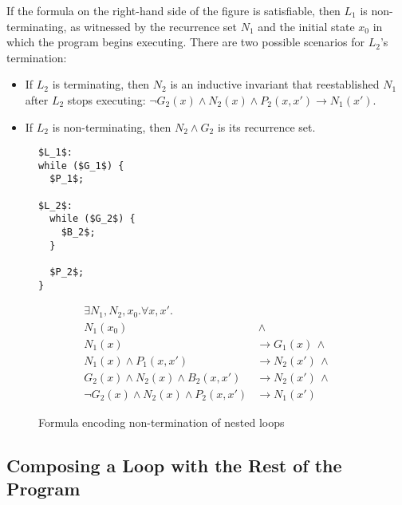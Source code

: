 \documentclass[preprint]{sigplanconf}
\theoremstyle{definition}
\begin{document}
If the formula on the right-hand side of the figure is satisfiable, then
$L_1$ is non-terminating, as witnessed by the recurrence set $N_1$ and the
initial state $x_0$ in which the program begins executing.  There are two
possible scenarios for $L_2$'s termination:
%
\begin{itemize}
%
\item If $L_2$ is terminating, then $N_2$ is an inductive invariant that
reestablished $N_1$ after $L_2$ stops executing: $\lnot G_2(x) \wedge N_2(x)
\wedge P_2(x,x') \rightarrow N_1(x') $.
%
\item If $L_2$ is non-terminating, then $N_2 \wedge G_2$ is its recurrence set.
%
\end{itemize}

\begin{figure*}
\begin{framed}
 \begin{minipage}{0.16\textwidth}
\begin{lstlisting}[mathescape=true]
$L_1$:
while ($G_1$) {
  $P_1$;

$L_2$:
  while ($G_2$) {
    $B_2$;
  }

  $P_2$;
}
\end{lstlisting}
\end{minipage}
\vline
\begin{minipage}{0.82\textwidth}
\begin{align*}
 \exists N_1, N_2, x_0 . \forall x, x' . \\
  N_1(x_0) & \, \wedge \\
  N_1(x) & \rightarrow G_1(x) \, \wedge \\
  N_1(x) \wedge P_1(x,x') & \rightarrow N_2(x') \, \wedge \\
  G_2(x) \wedge N_2(x) \wedge B_2(x,x') & \rightarrow N_2(x') \, \wedge \\
  \lnot G_2(x) \wedge N_2(x) \wedge P_2(x,x') & \rightarrow N_1(x') 
\end{align*}
\end{minipage}
\end{framed}

\caption{Formula encoding non-termination of nested loops \label{fig:nonterm-nested}}
\end{figure*}




\subsection{Composing a Loop with the Rest of the Program} \label{sec:env}
\end{document}
